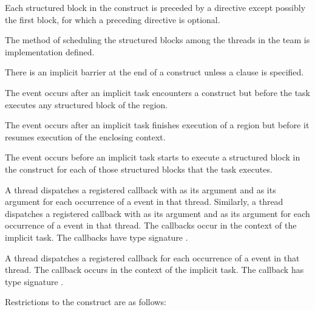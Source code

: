 \descr
Each structured block in the  construct is preceded by a 
 directive except possibly the first block, for which a preceding 
 directive is optional.

The method of scheduling the structured blocks among the threads in the team is
implementation defined.

There is an implicit barrier at the end of a  construct unless a 
 clause is specified.

\events

The  event occurs after an implicit task encounters a
 construct but before the task executes any 
structured block of the  region.

The  event occurs after an implicit task finishes execution 
of a  region but before it resumes execution of the enclosing context.

The  event occurs before an implicit task starts
to execute a structured block in the  construct for
each of those structured blocks that the task executes.

\tools

A thread dispatches a registered  callback with 
 as its  argument and  
as its  argument for each occurrence of a  event 
in that thread. Similarly, a thread dispatches a registered 
callback with  as its  argument and 
 as its  argument for each occurrence of 
a  event in that thread. The callbacks occur in the context 
of the implicit task. The callbacks have type signature .

A thread dispatches a registered 
callback for each occurrence of a  
event in that thread. The callback occurs in the
context of the implicit task.  The callback has type signature
. 

\restrictions
Restrictions to the  construct are as follows:

